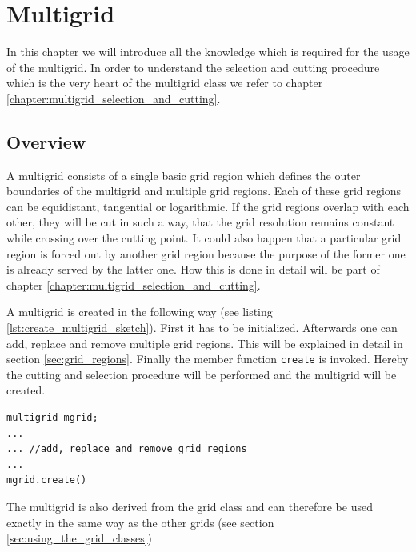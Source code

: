 \chapter{Multigrid} \label{chapter:multigrid_usage}
In this chapter we will introduce all the knowledge which is required for the usage of the multigrid. In order to understand the selection and cutting procedure which is the very heart of the multigrid class we refer to chapter \ref{chapter:multigrid_selection_and_cutting}.

\section{Overview}
A multigrid consists of a single basic grid region which defines the outer boundaries of the multigrid and multiple grid regions. Each of these grid regions can be equidistant, tangential or logarithmic. If the grid regions overlap with each other, they will be cut in such a way, that the grid resolution remains constant while crossing over the cutting point. It could also happen that a particular grid region is forced out by another grid region because the purpose of the former one is already served by the latter one. How this is done in detail will be part of chapter \ref{chapter:multigrid_selection_and_cutting}.

A multigrid is created in the following way (see listing \ref{lst:create_multigrid_sketch}). First it has to be initialized. Afterwards one can add, replace and remove multiple grid regions. This will be explained in detail in section \ref{sec:grid_regions}. Finally the member function \texttt{create} is invoked. Hereby the cutting and selection procedure will be performed and the multigrid will be created. 
\begin{lstlisting}[caption={Creating a multigrid},	label={lst:create_multigrid_sketch}]
multigrid mgrid;
... 
... //add, replace and remove grid regions
...
mgrid.create()
\end{lstlisting}
The multigrid is also derived from the grid class and can therefore be used exactly in the same way as the other grids (see section \ref{sec:using_the_grid_classes})

